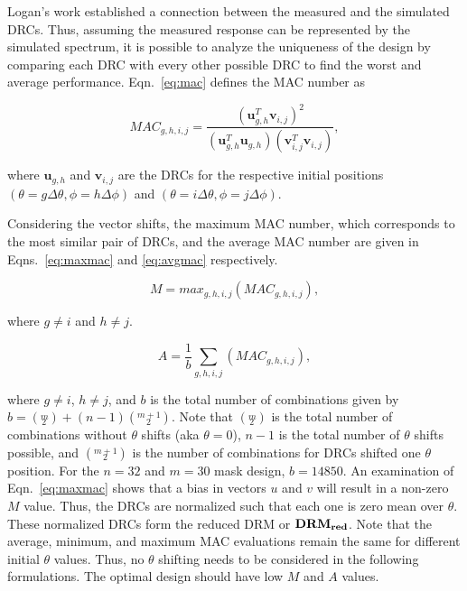 \documentclass[3p,times]{elsarticle}
\begin{document}
Logan's work established a connection between the measured and the simulated DRCs.
Thus, assuming the measured response can be represented by the simulated spectrum, it is possible to analyze the uniqueness of the design by comparing each DRC with every other possible DRC to find the worst and average performance.  
Eqn.~\ref{eq:mac} defines the MAC number as

\begin{equation}
MAC_{g,h,i,j}=\frac{\left(\mathbf{u}_{g,h}^T\mathbf{v}_{i,j}\right)^2}{\left(\mathbf{u}_{g,h}^T\mathbf{u}_{g,h}\right)\left(\mathbf{v}_{i,j}^T\mathbf{v}_{i,j}\right)},
\label{eq:mac}
\end{equation}

\noindent where $\mathbf{u}_{g,h}$ and $\mathbf{v}_{i,j}$ are the DRCs for the respective initial positions $\left(\theta=g\Delta\theta,\phi=h\Delta\phi\right)$ and
$\left(\theta=i\Delta\theta,\phi=j\Delta\phi\right)$.

Considering the vector shifts, the maximum MAC number, which corresponds to the most similar pair of DRCs, and the average MAC number are given in Eqns.~\ref{eq:maxmac} and \ref{eq:avgmac} respectively.

\begin{equation}
M=max_{g,h,i,j}\left(MAC_{g,h,i,j}\right),
\label{eq:maxmac}
\end{equation}

\noindent where $g\neq i$ and $h\neq j$.

\begin{equation}
A=\frac{1}{b}\sum_{g,h,i,j}\left(MAC_{g,h,i,j}\right),
\label{eq:avgmac}
\end{equation}

where $g\neq i$, $h\neq j$, and $b$ is the total number of combinations given by $b=\left(\overset{m}{_2}\right)+(n-1)\left(\overset{m+1}{_2}\right)$.  
Note that $\left(\overset{m}{_2}\right)$ is the total number of combinations without $\theta$ shifts (aka $\theta=0$), $n-1$ is the total number of $\theta$ shifts possible, and $\left(\overset{m+1}{_2}\right)$ is the number of combinations for DRCs shifted one $\theta$ position.  
For the $n=32$ and $m=30$ mask design, $b=14850$.  
An examination of Eqn.~\ref{eq:maxmac} shows that a bias in vectors $u$ and $v$ will result in a non-zero $M$ value.  
Thus, the DRCs are normalized such that each one is zero mean over $\theta$.  
These normalized DRCs form the reduced DRM or $\bf{DRM_{red}}$. 
Note that the average, minimum, and maximum MAC evaluations remain the same for different initial $\theta$ values.  
Thus, no $\theta$ shifting needs to be considered in the following formulations. 
The optimal design should have low $M$ and $A$ values.
\end{document}
